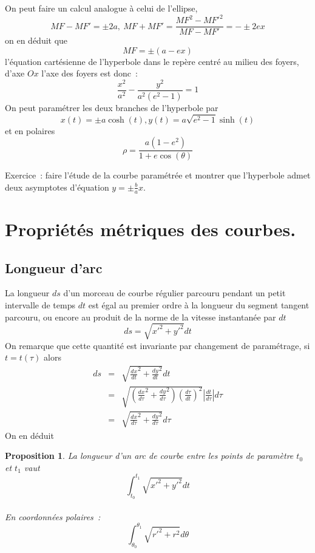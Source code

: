 \documentclass[a4paper,11pt]{article}
\newtheorem{prop}[thm]{Proposition}
\begin{document}
On peut faire un calcul analogue \`a celui de l'ellipse, 
$$ MF-MF'=\pm 2a, \ MF+MF'=\frac{MF^2-MF'^2}{MF-MF'}=-\pm 2ex$$
on en d\'eduit que
$$ MF=\pm (a-ex)$$
l'\'equation cart\'esienne de l'hyperbole dans le rep\`ere centr\'e au milieu
des foyers, d'axe $Ox$ l'axe des foyers est donc~:
$$ \frac{x^2}{a^2}-\frac{y^2}{a^2(e^2-1)}=1$$
On peut param\'etrer les deux branches de l'hyperbole par
$$ x(t)=\pm a\cosh(t), y(t)=a\sqrt{e^2-1} \sinh(t)$$
et en polaires
$$ \rho=\frac{a(1-e^2)}{1+e\cos(\theta)}$$

Exercice~: faire l'\'etude de la courbe param\'etr\'ee et montrer que
l'hyperbole admet deux asymptotes d'\'equation $y = \pm \frac{b}{a} x$.



\section{Propri\'et\'es m\'etriques des courbes.} \label{sec:courbes_m}
\subsection{Longueur d'arc}
La longueur $ds$ d'un morceau de courbe r\'egulier parcouru
pendant un petit intervalle de temps $dt$ est égal
au premier ordre à la longueur du segment tangent parcouru,
ou encore au produit de la norme de la vitesse instantanée 
par $dt$
$$ ds=\sqrt{x'^2+y'^2} dt$$
On remarque que cette quantit\'e est invariante par changement de 
param\'etrage, si $t=t(\tau)$ alors
\begin{eqnarray*} 
ds &= & \sqrt{\frac{dx}{dt}^2+\frac{dy}{dt}^2} dt \\
&=& \sqrt{ \left(\frac{dx}{d\tau}^2+\frac{dy}{d\tau}^2\right) 
\left(\frac{d\tau}{dt}\right)^2} |\frac{dt}{d\tau}| d\tau \\
& = & \sqrt{ \frac{dx}{d\tau}^2+\frac{dy}{d\tau}^2} d\tau
\end{eqnarray*}
On en déduit
\begin{prop} 
La longueur d'un arc de courbe entre les points
de paramètre $t_0$ et $t_1$ vaut
$$ \int_{t_0}^{t_1} \sqrt{x'^2+y'^2} dt$$\\
En coordonn\'ees polaires~:
$$ \int_{\theta_0}^{\theta_1} \sqrt{r'^2+r^2} d\theta$$
\end{prop}
\end{document}
